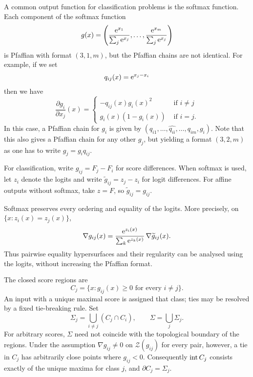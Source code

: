 \begin{example}[Softmax]\label{ex:softmax}
A common output function for classification problems is the softmax function. Each component of the softmax function
\begin{equation}\label{eq:softmax}
  g(x) = \left(\frac{\mathrm{e}^{x_1}}{\sum_{j}\mathrm{e}^{x_j}}, \dots, \frac{\mathrm{e}^{x_m}}{\sum_{j}\mathrm{e}^{x_j}}\right)
\end{equation}
is Pfaffian with format $(3,1,m)$, but the Pfaffian chains are not identical. For example, if we set
\[
q_{ij}(x) = \mathrm{e}^{x_j - x_i}
\]
then we have
\begin{equation*}
  \frac{\partial g_i}{\partial x_j}(x) = \begin{cases}
    -q_{ij} (x) g_i(x)^2 & \text{ if } i\neq j\\
    g_i(x)(1-g_i(x)) & \text{ if } i=j.
  \end{cases}
\end{equation*}
In this case, a Pfaffian chain for $g_i$ is given by $(q_{i1}, \dotsc , \widehat{q_{ii}}, \dotsc, q_{im}, g_i)$. Note that this also gives a Pfaffian chain for any other $g_j$, but yielding a format $(3, 2, m)$ as one has to write $g_j = g_i q_{ij}$.
\end{example}

For classification, write $g_{ij}=F_j-F_i$ for score differences. When softmax is used, let $z_i$ denote the logits and write $\widetilde g_{ij}=z_j-z_i$ for logit differences. For affine outputs without softmax, take $z=F$, so $\widetilde g_{ij}=g_{ij}$.

Softmax preserves every ordering and equality of the logits. More precisely, on $\{x:z_i(x)=z_j(x)\}$,
\[
\nabla g_{ij}(x)=\frac{\mathrm{e}^{z_i(x)}}{\sum_k\mathrm{e}^{z_k(x)}}\,
\nabla\widetilde g_{ij}(x).
\]
Thus pairwise equality hypersurfaces and their regularity can be analysed using the logits, without increasing the Pfaffian format.

The closed score regions are
\[
C_j=\{x\colon g_{ij}(x)\ge0\text{ for every }i\ne j\}.
\]
An input with a unique maximal score is assigned that class; ties may be resolved by a fixed tie-breaking rule. Set
\[
\Sigma_j=\bigcup_{i\ne j}(C_j\cap C_i),
\qquad
\Sigma=\bigcup_j\Sigma_j.
\]
For arbitrary scores, $\Sigma$ need not coincide with the topological boundary of the regions. Under the assumption $\nabla g_{ij}\ne0$ on $\mathcal Z(g_{ij})$ for every pair, however, a tie in $C_j$ has arbitrarily close points where $g_{ij}<0$. Consequently $\operatorname{int} C_j$ consists exactly of the unique maxima for class $j$, and $\partial C_j=\Sigma_j$.

